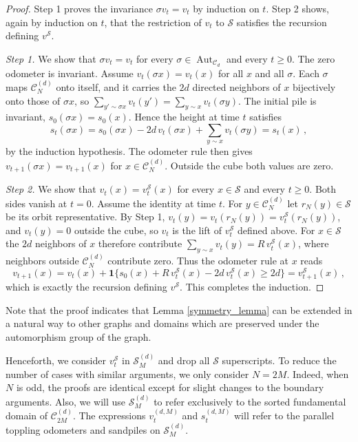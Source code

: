 \documentclass[12pt]{amsart}
\begin{document}
	\begin{proof}
Step 1 proves the invariance $\sigma v_t=v_t$ by induction on $t$. Step 2 shows, again by induction on $t$, that the restriction of $v_t$ to $\mathcal S$ satisfies the recursion defining $v^{\mathcal S}$.

\emph{Step 1.} We show that $\sigma v_t=v_t$ for every $\sigma\in\operatorname{Aut}_{\mathcal C_d}$ and every $t\geq0$. The zero odometer is invariant. Assume $v_t(\sigma x)=v_t(x)$ for all $x$ and all $\sigma$. Each $\sigma$ maps $\mathcal C_N^{(d)}$ onto itself, and it carries the $2d$ directed neighbors of $x$ bijectively onto those of $\sigma x$, so $\sum_{y'\sim\sigma x}v_t(y')=\sum_{y\sim x}v_t(\sigma y)$. The initial pile is invariant, $s_0(\sigma x)=s_0(x)$. Hence the height at time $t$ satisfies
\begin{equation*}
s_t(\sigma x)=s_0(\sigma x)-2d\,v_t(\sigma x)+\sum_{y\sim x}v_t(\sigma y)=s_t(x)\,,
\end{equation*}
by the induction hypothesis. The odometer rule then gives $v_{t+1}(\sigma x)=v_{t+1}(x)$ for $x\in\mathcal C_N^{(d)}$. Outside the cube both values are zero.

\emph{Step 2.} We show that $v_t(x)=v_t^{\mathcal S}(x)$ for every $x\in\mathcal S$ and every $t\geq0$. Both sides vanish at $t=0$. Assume the identity at time $t$. For $y\in\mathcal C_N^{(d)}$ let $r_N(y)\in\mathcal S$ be its orbit representative. By Step 1, $v_t(y)=v_t(r_N(y))=v_t^{\mathcal S}(r_N(y))$, and $v_t(y)=0$ outside the cube, so $v_t$ is the lift of $v_t^{\mathcal S}$ defined above. For $x\in\mathcal S$ the $2d$ neighbors of $x$ therefore contribute $\sum_{y\sim x}v_t(y)=R\,v_t^{\mathcal S}(x)$, where neighbors outside $\mathcal C_N^{(d)}$ contribute zero. Thus the odometer rule at $x$ reads
\begin{equation*}
v_{t+1}(x)=v_t(x)+\mathbf 1\{s_0(x)+R\,v_t^{\mathcal S}(x)-2d\,v_t^{\mathcal S}(x)\geq 2d\}=v_{t+1}^{\mathcal S}(x)\,,
\end{equation*}
which is exactly the recursion defining $v^{\mathcal S}$. This completes the induction.

    \end{proof}
	\noindent Note that the proof indicates that Lemma \ref{symmetry_lemma} can be extended in a natural way to 
	other graphs and domains which are preserved under the automorphism group of the graph. 
	
	
	Henceforth, we consider $v_t^{\mathcal{S}}$ in $\mathcal{S}_M^{(d)}$ and drop all $\mathcal{S}$ superscripts. To reduce the number of cases with similar 
	arguments, we only consider $N = 2 M$. Indeed, when $N$ is odd, the proofs
	are identical except for slight changes to the boundary arguments. Also, we will use $\mathcal{S}_M^{(d)}$ to refer exclusively to the sorted fundamental domain of $\mathcal{C}_{2M}^{(d)}$. The expressions $v_t^{(d,M)}$  and $s_t^{(d,M)}$ will refer to the parallel toppling odometers and sandpiles on $\mathcal{S}_M^{(d)}$. 
	
\end{document}

